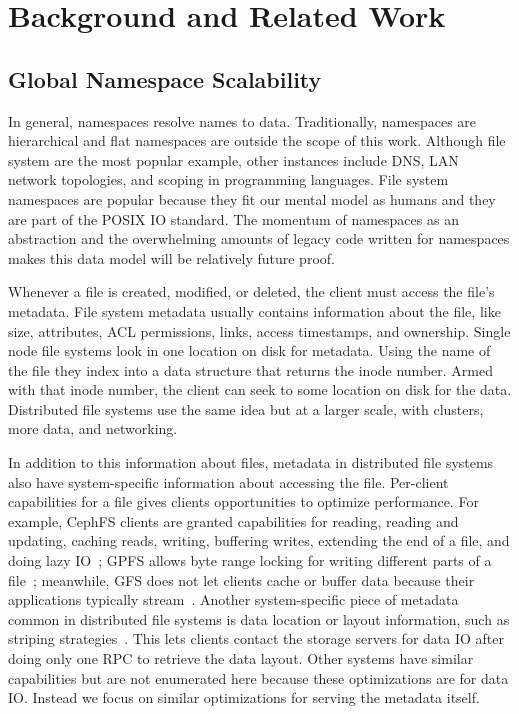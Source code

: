\chapter{Background and Related Work}
\label{related-work}

\section{Global Namespace Scalability}

In general, namespaces resolve names to data. Traditionally, namespaces are
hierarchical and flat namespaces are outside the scope of this work. Although
file system are the most popular example, other instances include DNS, LAN
network topologies, and scoping in programming languages.  File system
namespaces are popular because they fit our mental model as humans and they are
part of the POSIX IO standard. The momentum of namespaces as an abstraction and
the overwhelming amounts of legacy code written for namespaces makes this data
model will be relatively future proof.

Whenever a file is created, modified, or deleted, the client must access the
file's metadata. File system metadata usually contains information about the
file, like size, attributes, ACL permissions, links, access timestamps, and
ownership.  Single node file systems look in one location on disk for metadata.
Using the name of the file they index into a data structure that returns the
inode number. Armed with that inode number, the client can seek to some
location on disk for the data. Distributed file systems use the same idea but
at a larger scale, with clusters, more data, and networking.

In addition to this information about files, metadata in distributed file
systems also have system-specific information about accessing the file.
Per-client capabilities for a file gives clients opportunities to optimize
performance.  For example, CephFS clients are granted capabilities for reading,
reading and updating, caching reads, writing, buffering writes, extending the
end of a file, and doing lazy IO~\cite{docs:cephcaps}; GPFS allows byte range
locking for writing different parts of a file~\cite{schmuck:fast2002-gpfs};
meanwhile, GFS does not let clients cache or buffer data because their
applications typically stream~\cite{ghemawat:sosp2003-gfs}. Another
system-specific piece of metadata common in distributed file systems is data
location or layout information, such as striping
strategies~\cite{nagle_panasas_2004, welch:fast08-panasas, wang:tech09-lustre,
docs:cephstripe, sinnamohideen:atc2010-ursa, ghemawat:sosp2003-gfs}. This lets
clients contact the storage servers for data IO after doing only one RPC to
retrieve the data layout.  Other systems have similar capabilities but are not
enumerated here because these optimizations are for data IO. Instead we focus
on similar optimizations for serving the metadata itself.

